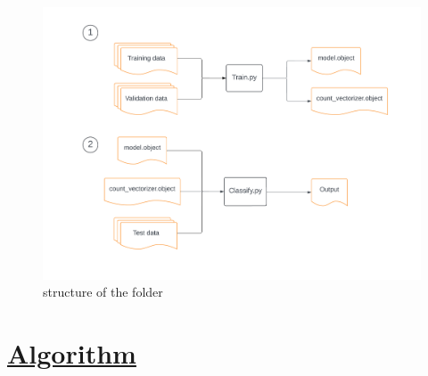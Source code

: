 \documentclass[12pt, a4paper]{article}
\newcommand{\ulsection}[1]{\texorpdfstring{\uline{#1}}{#1}}
\begin{document}
\begin{figure}[ht]
    \centering
    \hfuzz=15pt \includegraphics[width=1.0\textwidth]{Train_Test_pipeline}
    \caption{\large structure of the folder}
    \label{fig:mesh4}
\end{figure}
\section{\ulsection{Algorithm}}
\end{document}
